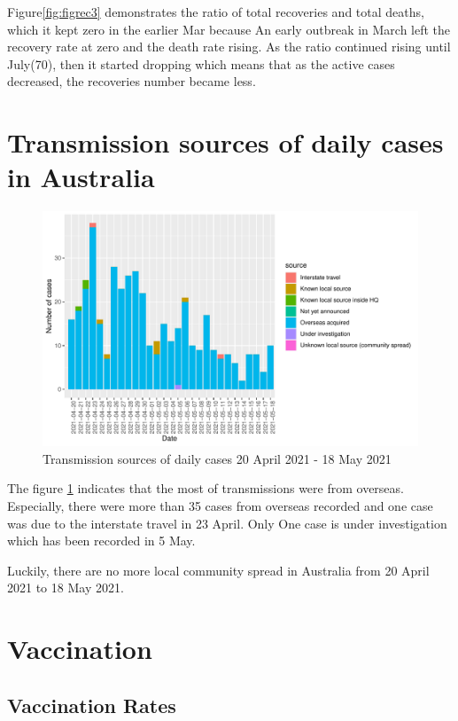 \documentclass[11pt,a4paper,]{article}
\begin{document}
Figure\ref{fig:figrec3} demonstrates the ratio of total recoveries and total deaths, which it kept zero in the earlier Mar because An early outbreak in March left the recovery rate at zero and the death rate rising. As the ratio continued rising until July(70), then it started dropping which means that as the active cases decreased, the recoveries number became less.

\section*{Transmission sources of daily cases in Australia}

\begin{figure}

{\centering \includegraphics{report_files/figure-latex/tra-1} 

}

\caption{Transmission sources of daily cases 20 April 2021 - 18 May 2021}\label{fig:tra}
\end{figure}

The figure \ref{fig:tra} indicates that the most of transmissions were from overseas. Especially, there were more than 35 cases from overseas recorded and one case was due to the interstate travel in 23 April. Only One case is under investigation which has been recorded in 5 May.

Luckily, there are no more local community spread in Australia from 20 April 2021 to 18 May 2021.

\section*{Vaccination}

\hypertarget{vaccination-rates}{%
\subsection{Vaccination Rates}\label{vaccination-rates}}
\end{document}
